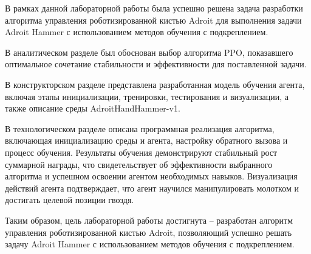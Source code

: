 
В рамках данной лабораторной работы была успешно решена задача разработки алгоритма управления роботизированной кистью 
Adroit для выполнения задачи Adroit Hammer с использованием методов обучения с подкреплением.

В аналитическом разделе был обоснован выбор алгоритма PPO, показавшего оптимальное сочетание стабильности и эффективности для поставленной задачи.

В конструкторском разделе представлена разработанная модель обучения агента, включая этапы инициализации, тренировки, тестирования и визуализации, 
а также описание среды AdroitHandHammer-v1.

В технологическом разделе описана программная реализация алгоритма, включающая инициализацию среды и агента, настройку обратного вызова и процесс обучения. 
Результаты обучения демонстрируют стабильный рост суммарной награды, что свидетельствует об эффективности выбранного алгоритма и успешном освоении агентом необходимых навыков. 
Визуализация действий агента подтверждает, что агент научился манипулировать молотком и достигать целевой позиции гвоздя.

Таким образом, цель лабораторной работы достигнута – разработан алгоритм управления роботизированной кистью Adroit, позволяющий успешно решать задачу Adroit Hammer 
с использованием методов обучения с подкреплением.
